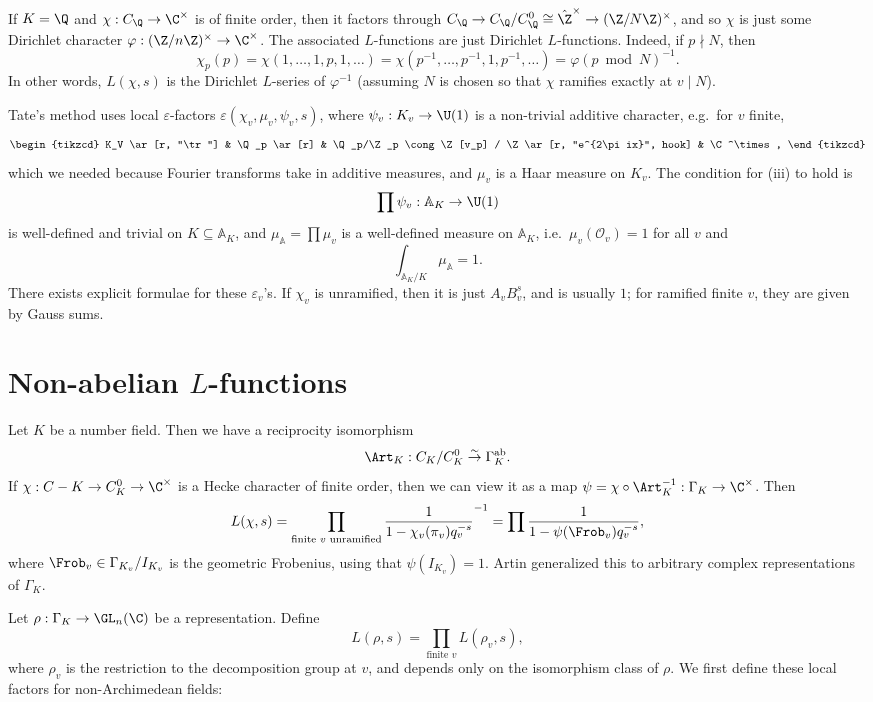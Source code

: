 \documentclass[a4paper]{article}
\newcommand\A{\mathbb{A}}
\newcommand\ab{\mathrm{ab}}
\begin{document}
If $K = \Q$ and $\chi: C_\Q \to \C^\times$ is of finite order, then it factors through $C_\Q \to C_\Q/C_\Q^0 \cong \hat{\Z}^\times \to (\Z/N\Z)^\times$, and so $\chi$ is just some Dirichlet character $\varphi: (\Z/n\Z)^\times \to \C^\times$. The associated $L$-functions are just Dirichlet $L$-functions. Indeed, if $p \nmid N$, then
\[
  \chi_p(p) = \chi(1, \ldots, 1, p, 1, \ldots) = \chi(p^{-1}, \ldots, p^{-1}, 1, p^{-1}, \ldots) = \varphi(p\bmod N)^{-1}.
\]
In other words, $L(\chi, s)$ is the Dirichlet $L$-series of $\varphi^{-1}$ (assuming $N$ is chosen so that $\chi$ ramifies exactly at $v \mid N$).

Tate's method uses local $\varepsilon$-factors $\varepsilon(\chi_v, \mu_v, \psi_v, s)$, where $\psi_v: K_v \to \U(1)$ is a non-trivial additive character, e.g.\ for $v$ finite,
\[
  \begin{tikzcd}
    K_V \ar[r, "\tr"] & \Q_p \ar[r] & \Q_p/\Z_p  \cong \Z[v_p] / \Z \ar[r, "e^{2\pi ix}", hook] & \C^\times, 
  \end{tikzcd}
\]
which we needed because Fourier transforms take in additive measures, and $\mu_v$ is a Haar measure on $K_v$. The condition for (iii) to hold is
\[
  \prod \psi_v: \A_K \to \U(1)
\]
is well-defined and trivial on $K \subseteq \A_K$, and $\mu_\A = \prod \mu_v$ is a well-defined measure on $\A_K$, i.e.\ $\mu_v(\mathcal{O}_v) = 1$ for all $v$ and
\[
  \int_{\A_K/K} \mu_\A = 1.
\]
There exists explicit formulae for these $\varepsilon_v$'s. If $\chi_v$ is unramified, then it is just $A_v B_v^s$, and is usually $1$; for ramified finite $v$, they are given by Gauss sums.

\section{Non-abelian \texorpdfstring{$L$}{L}-functions}
Let $K$ be a number field. Then we have a reciprocity isomorphism
\[
  \Art_K: C_K/C_K^0 \overset{\sim}{\to} \Gamma_K^{\ab}.
\]
If $\chi: C-K \to C_K^0 \to \C^\times$ is a Hecke character of finite order, then we can view it as a map $\psi = \chi \circ \Art_K^{-1}: \Gamma_K \to \C^\times$. Then
\[
  L(\chi, s) = \prod_{\text{finite }v\text{ unramified}} \frac{1}{1 - \chi_v(\pi_v) q_v^{-s}}^{-1} = \prod \frac{1}{1 - \psi(\Frob_v) q_v^{-s}},
\]
where $\Frob_v \in \Gamma_{K_v}/I_{K_v}$ is the geometric Frobenius, using that $\psi(I_{K_v}) = 1$. Artin generalized this to arbitrary complex representations of $\Gamma_K$.

Let $\rho: \Gamma_K \to \GL_n(\C)$ be a representation. Define
\[
  L(\rho, s) = \prod_{\text{finite }v} L(\rho_v, s),
\]
where $\rho_v$ is the restriction to the decomposition group at $v$, and depends only on the isomorphism class of $\rho$. We first define these local factors for non-Archimedean fields:
\end{document}
